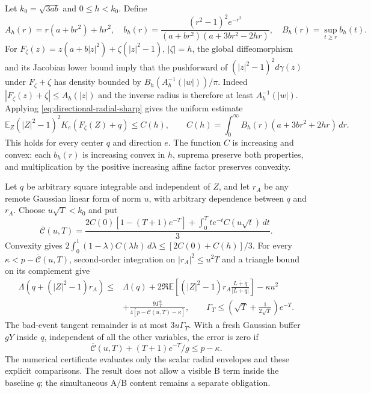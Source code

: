 Let $k_0=\sqrt{3ab}$ and $0\le h<k_0$. Define
\[
 A_h(r)=r(a+br^2)+hr^2,\quad
 b_h(r)=\frac{(r^2-1)^2e^{-r^2}}
 {(a+br^2)(a+3br^2-2hr)},\quad
 B_h(r)=\sup_{t\ge r}b_h(t).
\]
For $F_\zeta(z)=z(a+b|z|^2)+\zeta(|z|^2-1)$, $|\zeta|=h$,
the global diffeomorphism and its Jacobian lower bound imply that
the pushforward of $(|z|^2-1)^2d\gamma(z)$ under $F_\zeta+\zeta$
has density bounded by
$B_h(A_h^{-1}(|w|))/\pi$.
Indeed $|F_\zeta(z)+\zeta|\le A_h(|z|)$ and the inverse radius is
therefore at least $A_h^{-1}(|w|)$.
Applying \eqref{eq:directional-radial-sharp} gives the uniform estimate
\[
 \mathbb E_Z(|Z|^2-1)^2K_e(F_\zeta(Z)+q)\le C(h),\qquad
 C(h)=\int_0^\infty B_h(r)(a+3br^2+2hr)\,dr.
\]
This holds for every center $q$ and direction $e$.
The function $C$ is increasing and convex: each $b_h(r)$ is increasing
convex in $h$, suprema preserve both properties, and multiplication by
the positive increasing affine factor preserves convexity.

Let $q$ be arbitrary square integrable and independent of $Z$, and let
$r_A$ be any remote Gaussian linear form of norm $u$, with arbitrary
dependence between $q$ and $r_A$. Choose $u\sqrt T<k_0$ and put
\[
 \overline{\mathcal C}(u,T)=
 \frac{2C(0)[1-(T+1)e^{-T}]
 +\int_0^Tte^{-t}C(u\sqrt t)\,dt}{3}.
\]
Convexity gives
$2\int_0^1(1-\lambda)C(\lambda h)\,d\lambda
\le[2C(0)+C(h)]/3$.
For every $\kappa<p-\overline{\mathcal C}(u,T)$, second-order integration
on $|r_A|^2\le u^2T$ and a triangle bound on its complement give
\[
 \begin{split}
 \Lambda(q+(|Z|^2-1)r_A)\le {}&\Lambda(q)
 +2\Re\mathbb E\left[(|Z|^2-1)r_A
       \frac{\overline{L+q}}{|L+q|}\right]-\kappa u^2\\
 &+\frac{9\Gamma_T^2}
 {4[p-\overline{\mathcal C}(u,T)-\kappa]},
 \qquad
 \Gamma_T\le\left(\sqrt T+\frac1{2\sqrt T}\right)e^{-T}.
 \end{split}
\]
The bad-event tangent remainder is at most $3u\Gamma_T$.
With a fresh Gaussian buffer $gY$ inside $q$, independent of all the
other variables, the error is zero if
\[
 \overline{\mathcal C}(u,T)+(T+1)e^{-T}/g\le p-\kappa.
\]
The numerical certificate evaluates only the scalar radial envelopes
and these explicit comparisons. The result does not allow a visible
B term inside the baseline $q$; the simultaneous A/B content remains
a separate obligation.

